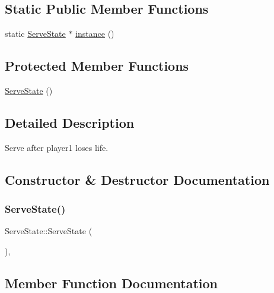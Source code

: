 \subsection*{Static Public Member Functions}
\begin{DoxyCompactItemize}
\item 
static \mbox{\hyperlink{class_serve_state}{Serve\+State}} $\ast$ \mbox{\hyperlink{class_serve_state_ac0f3ead67813e13e2a84026162da3b7c}{instance}} ()
\end{DoxyCompactItemize}
\subsection*{Protected Member Functions}
\begin{DoxyCompactItemize}
\item 
\mbox{\hyperlink{class_serve_state_a4c147afd3a49deed30013aaad7052383}{Serve\+State}} ()
\end{DoxyCompactItemize}


\subsection{Detailed Description}
Serve after player1 loses life. 

\subsection{Constructor \& Destructor Documentation}
\mbox{\label{class_serve_state_a4c147afd3a49deed30013aaad7052383}} 
\subsubsection{\texorpdfstring{ServeState()}{ServeState()}}
{\footnotesize\ttfamily Serve\+State\+::\+Serve\+State (\begin{DoxyParamCaption}{ }\end{DoxyParamCaption})\hspace{0.3cm}{\ttfamily [inline]}, {\ttfamily [protected]}}



\subsection{Member Function Documentation}
\mbox{\label{class_serve_state_a3516119feb2bf386b3686867da412328}} 
